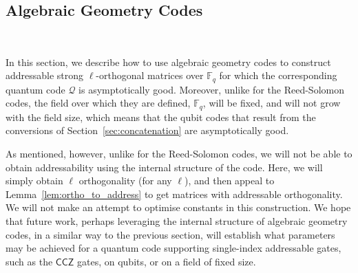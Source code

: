 \documentclass[11pt]{article}
\theoremstyle{definition}
\newcommand{\CCZ}{\mathsf{CCZ}}
\newcommand{\qcode}{\mathcal{Q}}
\begin{document}
\subsection{Algebraic Geometry Codes}~\label{sec:AG}

In this section, we describe how to use algebraic geometry codes to construct addressable strong $\ell$-orthogonal matrices over $\mathbb{F}_q$ for which the corresponding quantum code $\qcode$ is asymptotically good. Moreover, unlike for the Reed-Solomon codes, the field over which they are defined, $\mathbb{F}_q$, will be fixed, and will not grow with the field size, which means that the qubit codes that result from the conversions of Section~\ref{sec:concatenation} are asymptotically good.

As mentioned, however, unlike for the Reed-Solomon codes, we will not be able to obtain addressability using the internal structure of the code. Here, we will simply obtain $\ell$ orthogonality (for any $\ell$), and then appeal to Lemma~\ref{lem:ortho_to_address} to get matrices with addressable orthogonality. We will not make an attempt to optimise constants in this construction. We hope that future work, perhaps leveraging the internal structure of algebraic geometry codes, in a similar way to the previous section, will establish what parameters may be achieved for a quantum code supporting single-index addressable gates, such as the $\CCZ$ gates, on qubits, or on a field of fixed size.
\end{document}
